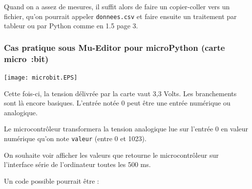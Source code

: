 \documentclass[11pt]{article}
\begin{document}
 
 
 Quand on a assez de mesures, il suffit alors de faire un copier-coller vers un fichier, qu'on pourrait appeler \texttt{donnees.csv} et faire ensuite un traitement par tableur ou par Python comme en 1.5 page 3.
 
 
 
 
 
 
 
 \subsubsection{Cas pratique sous Mu-Editor pour microPython (carte micro~:bit)}
 
 
  
  \begin{center}
   \texttt{[image: microbit.EPS]}
  \end{center}
  
  
  Cette fois-ci, la tension délivrée par la carte vaut 3,3 Volts. Les branchements sont là encore basiques. L'entrée notée 0 peut être une entrée numérique ou analogique.

  
  \smallskip
 Le microcontrôleur transformera la tension analogique lue sur l'entrée 0 en valeur numérique qu'on note \texttt{valeur} (entre 0 et 1023).
 
 \smallskip
 On souhaite voir afficher les valeurs que retourne le microcontrôleur sur l'interface série de l'ordinateur toutes les 500 ms. 
 
 \smallskip
 Un code possible pourrait être : 
 
\end{document}
